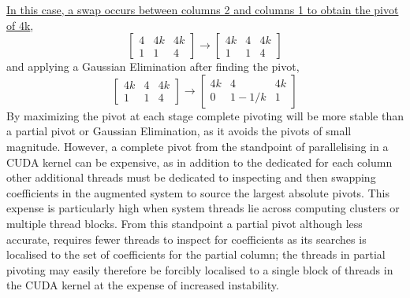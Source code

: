 \documentclass[7pt]{article}
\begin{document}
\underline{In this case, a swap occurs between columns 2 and columns 1 to obtain the pivot of 4k}, 
\begin{equation*}
\left[
\begin{array} {cc|c}%
4 & 4k & 4k \\  
1 & 1 & 4
\end{array} \right] \rightarrow \left[
\begin{array} {cc|c}%
4k & 4 & 4k \\  
1 & 1 & 4
\end{array} \right]
\end{equation*}
and applying a Gaussian Elimination after finding the pivot, 
\begin{equation*}
  \left[ \begin{array}   {cc|c}%
4k & 4 & 4k \\  
1 & 1 & 4
\end{array} 
\right] \rightarrow   \left[ \begin{array}   {cc|c}%
4k & 4 & 4k \\  
0	  & 1 - 1/k & 1
\end{array} 
\right] 
\end{equation*}
By maximizing the pivot at each stage complete pivoting will be more stable than a partial pivot or Gaussian Elimination, as it avoids the pivots of small magnitude. However, a complete pivot from the standpoint of parallelising in a CUDA kernel can be expensive, as in addition to the dedicated for each column other additional threads must be dedicated to inspecting and then swapping coefficients in the augmented system to source the largest absolute pivots. This expense is particularly high when system threads lie across computing clusters or multiple thread blocks. From this standpoint a partial pivot although less accurate, requires fewer threads to inspect for coefficients as its searches is localised to the set of coefficients for the partial column; the threads in partial pivoting may easily therefore be forcibly localised to a single block of threads in the  CUDA kernel at the expense of increased instability.  

\begin{figure}
	\label{right-hand-calc}	
\end{figure} 




 
\end{document}

